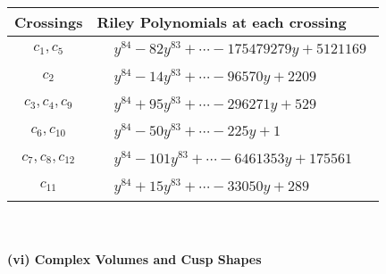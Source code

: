 \documentclass[1p]{elsarticle_modified}
\theoremstyle{definition}
\begin{document}
\begin{tabular}{m{50pt}|m{274pt}}
Crossings & \hspace{64pt}Riley Polynomials at each crossing \\
\hline $$\begin{aligned}c_{1},c_{5}\end{aligned}$$&$\begin{aligned}
&y^{84}-82 y^{83}+\cdots-175479279 y+5121169
\end{aligned}$\\
\hline $$\begin{aligned}c_{2}\end{aligned}$$&$\begin{aligned}
&y^{84}-14 y^{83}+\cdots-96570 y+2209
\end{aligned}$\\
\hline $$\begin{aligned}c_{3},c_{4},c_{9}\end{aligned}$$&$\begin{aligned}
&y^{84}+95 y^{83}+\cdots-296271 y+529
\end{aligned}$\\
\hline $$\begin{aligned}c_{6},c_{10}\end{aligned}$$&$\begin{aligned}
&y^{84}-50 y^{83}+\cdots-225 y+1
\end{aligned}$\\
\hline $$\begin{aligned}c_{7},c_{8},c_{12}\end{aligned}$$&$\begin{aligned}
&y^{84}-101 y^{83}+\cdots-6461353 y+175561
\end{aligned}$\\
\hline $$\begin{aligned}c_{11}\end{aligned}$$&$\begin{aligned}
&y^{84}+15 y^{83}+\cdots-33050 y+289
\end{aligned}$\\
\hline
\end{tabular}\\~\\
\newpage\flushleft \textbf{(vi) Complex Volumes and Cusp Shapes}
\end{document}
